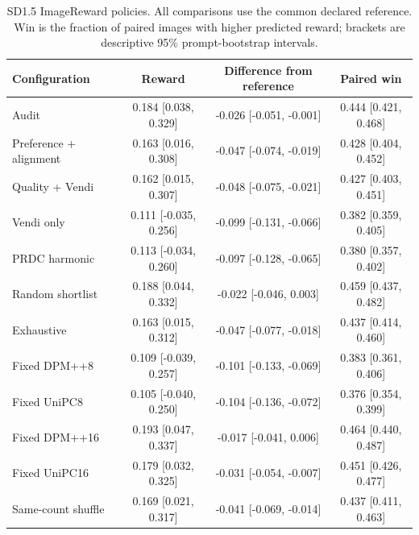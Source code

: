 \begin{table}[t]\centering\small
\caption{SD1.5 ImageReward policies. All comparisons use the common declared reference. Win is the fraction of paired images with higher predicted reward; brackets are descriptive 95\% prompt-bootstrap intervals.}
\begin{tabular}{lccc}\toprule
Configuration & Reward & Difference from reference & Paired win \\\midrule
Audit & 0.184 [0.038, 0.329] & -0.026 [-0.051, -0.001] & 0.444 [0.421, 0.468] \\
Preference + alignment & 0.163 [0.016, 0.308] & -0.047 [-0.074, -0.019] & 0.428 [0.404, 0.452] \\
Quality + Vendi & 0.162 [0.015, 0.307] & -0.048 [-0.075, -0.021] & 0.427 [0.403, 0.451] \\
Vendi only & 0.111 [-0.035, 0.256] & -0.099 [-0.131, -0.066] & 0.382 [0.359, 0.405] \\
PRDC harmonic & 0.113 [-0.034, 0.260] & -0.097 [-0.128, -0.065] & 0.380 [0.357, 0.402] \\
Random shortlist & 0.188 [0.044, 0.332] & -0.022 [-0.046, 0.003] & 0.459 [0.437, 0.482] \\
Exhaustive & 0.163 [0.015, 0.312] & -0.047 [-0.077, -0.018] & 0.437 [0.414, 0.460] \\
Fixed DPM++8 & 0.109 [-0.039, 0.257] & -0.101 [-0.133, -0.069] & 0.383 [0.361, 0.406] \\
Fixed UniPC8 & 0.105 [-0.040, 0.250] & -0.104 [-0.136, -0.072] & 0.376 [0.354, 0.399] \\
Fixed DPM++16 & 0.193 [0.047, 0.337] & -0.017 [-0.041, 0.006] & 0.464 [0.440, 0.487] \\
Fixed UniPC16 & 0.179 [0.032, 0.325] & -0.031 [-0.054, -0.007] & 0.451 [0.426, 0.477] \\
Same-count shuffle & 0.169 [0.021, 0.317] & -0.041 [-0.069, -0.014] & 0.437 [0.411, 0.463] \\
\bottomrule\end{tabular}\end{table}
